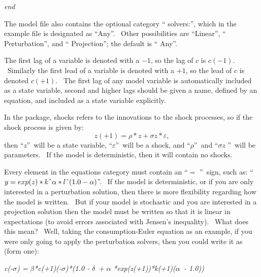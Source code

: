\documentclass[notitlepage,11pt]{article}
\begin{document}
\textit{end}

\bigskip

The model file also contains the optional category \textquotedblleft
solvers:\textquotedblright , which in the example file is designated as
\textquotedblleft Any\textquotedblright . \ Other possibilities are
\textquotedblleft Linear\textquotedblright , \textquotedblleft
Perturbation\textquotedblright , and \textquotedblleft
Projection\textquotedblright ; the default is \textquotedblleft
Any\textquotedblright .

The first lag of a variable is denoted with a $-1$, so the lag of $c$ is $%
c(-1)$. \ Similarly the first lead of a variable is denoted with a $+1$, so
the lead of $c$ is denoted $c(+1)$. \ The first lag of any model variable is
automatically included as a state variable, second and higher lags should be
given a name, defined by an equation, and included as a state variable
explicitly.

In the package, shocks refers to the innovations to the shock processes, so
if the shock process is given by:%
\begin{equation*}
z(+1)=\rho \ast z+\sigma z\ast \varepsilon ,
\end{equation*}%
then \textquotedblleft $z$\textquotedblright\ will be a state variable,
\textquotedblleft $\varepsilon $\textquotedblright\ will be a shock, and
\textquotedblleft $\rho $\textquotedblright\ and \textquotedblleft $\sigma z$%
\textquotedblright\ will be parameters. \ If the model is deterministic,
then it will contain no shocks.

Every element in the equations category must contain an \textquotedblleft $=$%
\textquotedblright\ sign, such as: \textquotedblleft $y=exp(z)\ast k\symbol{%
94}\alpha \ast l\symbol{94}(1.0-\alpha )$\textquotedblright . \ If the model
is deterministic, or if you are only interested in a perturbation solution,
then there is more flexibility regarding how the model is written. \ But if
your model is stochastic and you are interested in a projection solution
then the model must be written so that it is linear in expectations (to
avoid errors associated with Jensen's inequality). \ What does this mean? \
Well, taking the consumption-Euler equation as an example, if you were only
going to apply the perturbation solvers, then you could write it as (form
one):

\bigskip

\textit{c(-}$\sigma $\textit{) = }$\beta $\textit{*c(+1)\symbol{94%
}(-}$\sigma $\textit{)*(1.0 - }$\delta $\textit{\ + }$\alpha $\textit{%
*exp(z(+1))*k(+1)\symbol{94}(}$\alpha $\textit{\ - 1.0))}
\end{document}
